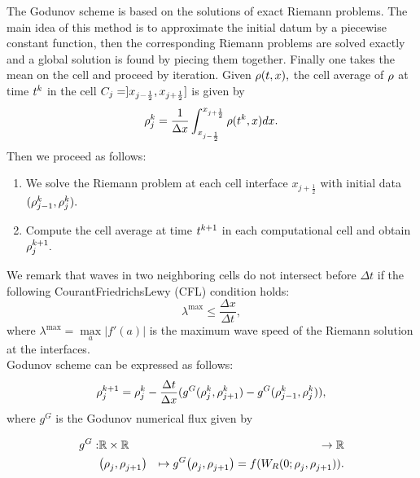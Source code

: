 		The Godunov scheme is based on the solutions of exact Riemann problems. The main idea of this method is to approximate the initial datum by a piecewise constant function, then the corresponding Riemann problems are solved exactly and a global solution is found by piecing them together. Finally one takes the mean on the cell and proceed by iteration. Given $\rho(t,x),$ the cell average of $\rho$ at time $t^{k}$ in the cell $C_{j}=]x_{j-\frac{1}{2}},x_{j+\frac{1}{2}}]$ is given by 
		\begin{equation}
			\rho_{j}^{k}=\dfrac{1}{\Delta x}\int_{x_{j-\frac{1}{2}}}^{x_{j+\frac{1}{2}}}\rho(t^{k},x)dx.\label{eq:godproj}
		\end{equation}
		Then we proceed as follows:
		\begin{enumerate}
			\item We solve the Riemann problem at each cell interface $x_{j+\frac{1}{2}}$ with initial data $(\rho^{k}_{j-1},\rho^{k}_{j}).$
			\item Compute the cell average at time $t^{k +1}$ in each computational cell and obtain $\rho^{k +1}_{j}.$ 
		\end{enumerate}
				
		We remark that waves in two neighboring cells do not intersect before $\Delta t$ if the following Courant\textendash{}Friedrichs\textendash{}Lewy (CFL) condition holds:
		\begin{equation}\label{eq:CFL}
			\lambda^{\max}\le\frac{\Delta x}{\Delta t},
		\end{equation}
		where $\lambda^{\max}=\underset{a}{\max}|f'\left(a\right)|$ is the maximum wave speed of the Riemann solution at the interfaces.\\
		Godunov scheme can be expressed as follows:
		\begin{equation}
			\rho_{j}^{k+1}=\rho_{j}^{k}-\frac{\Delta t}{\Delta x}(g^{G}(\rho_{j}^{k},\rho_{j+1}^{k})-g^{G}(\rho_{j-1}^{k},\rho_{j}^{k})),\label{eq:godscheme}
		\end{equation}
		where $g^{G}$ is the Godunov numerical flux given by
				
		\begin{eqnarray*}
			\god: & \mathbb{R}\times\mathbb{R} & \rightarrow\mathbb{R}\\
			& \left(\discrete{\xind}{},\discrete{\xind+1}{}\right) & \mapsto\god\left(\discrete{\xind}{},\discrete{\xind+1}{}\right)=f(W_{R}(0;\discrete{\xind}{},\discrete{\xind+1}{})).
		\end{eqnarray*}
				
